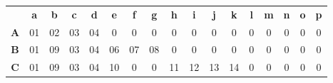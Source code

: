 \documentclass[12pt, twoside, openright]{report} %
\begin{document}
\begin{table}[H]
	\centering
	\begin{tabular}{ccccccccccccccccc}
		                                & \textbf{a}              & \textbf{b}              & \textbf{c}              & \textbf{d}              & \textbf{e}                                     & \textbf{f}                                     & \textbf{g}                                     & \textbf{h}                                     & \textbf{i}                                     & \textbf{j}                                     & \textbf{k}                                     & \textbf{l}                                     & \textbf{m}                                     & \textbf{n}                                     & \textbf{o}                                     & \textbf{p}                                     \\ \cline{2-17}
		\multicolumn{1}{c|}{\textbf{A}} & \multicolumn{1}{c|}{01} & \multicolumn{1}{c|}{02} & \multicolumn{1}{c|}{03} & \multicolumn{1}{c|}{04} & \multicolumn{1}{c|}{\cellcolor[HTML]{C0C0C0}0} & \multicolumn{1}{c|}{\cellcolor[HTML]{C0C0C0}0} & \multicolumn{1}{c|}{\cellcolor[HTML]{C0C0C0}0} & \multicolumn{1}{c|}{\cellcolor[HTML]{C0C0C0}0} & \multicolumn{1}{c|}{\cellcolor[HTML]{C0C0C0}0} & \multicolumn{1}{c|}{\cellcolor[HTML]{C0C0C0}0} & \multicolumn{1}{c|}{\cellcolor[HTML]{C0C0C0}0} & \multicolumn{1}{c|}{\cellcolor[HTML]{C0C0C0}0} & \multicolumn{1}{c|}{\cellcolor[HTML]{C0C0C0}0} & \multicolumn{1}{c|}{\cellcolor[HTML]{C0C0C0}0} & \multicolumn{1}{c|}{\cellcolor[HTML]{C0C0C0}0} & \multicolumn{1}{c|}{\cellcolor[HTML]{C0C0C0}0} \\ \cline{2-17}
		\multicolumn{1}{c|}{\textbf{B}} & \multicolumn{1}{c|}{01} & \multicolumn{1}{c|}{09} & \multicolumn{1}{c|}{03} & \multicolumn{1}{c|}{04} & \multicolumn{1}{c|}{06}                        & \multicolumn{1}{c|}{07}                        & \multicolumn{1}{c|}{08}                        & \multicolumn{1}{c|}{\cellcolor[HTML]{C0C0C0}0} & \multicolumn{1}{c|}{\cellcolor[HTML]{C0C0C0}0} & \multicolumn{1}{c|}{\cellcolor[HTML]{C0C0C0}0} & \multicolumn{1}{c|}{\cellcolor[HTML]{C0C0C0}0} & \multicolumn{1}{c|}{\cellcolor[HTML]{C0C0C0}0} & \multicolumn{1}{c|}{\cellcolor[HTML]{C0C0C0}0} & \multicolumn{1}{c|}{\cellcolor[HTML]{C0C0C0}0} & \multicolumn{1}{c|}{\cellcolor[HTML]{C0C0C0}0} & \multicolumn{1}{c|}{\cellcolor[HTML]{C0C0C0}0} \\ \cline{2-17}
		\multicolumn{1}{c|}{\textbf{C}} & \multicolumn{1}{c|}{01} & \multicolumn{1}{c|}{09} & \multicolumn{1}{c|}{03} & \multicolumn{1}{c|}{04} & \multicolumn{1}{c|}{10}                        & \multicolumn{1}{c|}{\cellcolor[HTML]{C0C0C0}0} & \multicolumn{1}{c|}{\cellcolor[HTML]{C0C0C0}0} & \multicolumn{1}{c|}{11}                        & \multicolumn{1}{c|}{12}                        & \multicolumn{1}{c|}{13}                        & \multicolumn{1}{c|}{14}                        & \multicolumn{1}{c|}{\cellcolor[HTML]{C0C0C0}0} & \multicolumn{1}{c|}{\cellcolor[HTML]{C0C0C0}0} & \multicolumn{1}{c|}{\cellcolor[HTML]{C0C0C0}0} & \multicolumn{1}{c|}{\cellcolor[HTML]{C0C0C0}0} & \multicolumn{1}{c|}{\cellcolor[HTML]{C0C0C0}0} \\ \cline{2-17}

\end{tabular}
\end{table}
\end{document}
